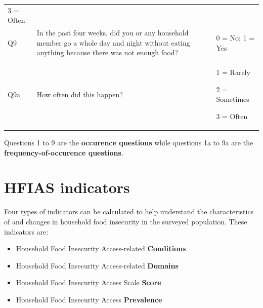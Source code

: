 \documentclass[12pt,]{book}
\theoremstyle{definition}
\theoremstyle{definition}
\theoremstyle{definition}
\theoremstyle{remark}
\begin{document}
\begin{longtable}[]{@{}lll@{}}
\begin{minipage}[t]{0.32\columnwidth}
3 = Often\strut
\end{minipage}\tabularnewline
\begin{minipage}[t]{0.07\columnwidth}\raggedright
Q9\strut
\end{minipage} & \begin{minipage}[t]{0.62\columnwidth}\raggedright
In the past four weeks, did you or any household member go a whole day
and night without eating anything because there was not enough
food?\strut
\end{minipage} & \begin{minipage}[t]{0.22\columnwidth}\raggedright
0 = No; 1 = Yes\strut
\end{minipage}\tabularnewline
\begin{minipage}[t]{0.32\columnwidth}\raggedright
Q9a\strut
\end{minipage} & \begin{minipage}[t]{0.32\columnwidth}\raggedright
How often did this happen?\strut
\end{minipage} & \begin{minipage}[t]{0.32\columnwidth}\raggedright
1 = Rarely

2 = Sometimes

3 = Often\strut
\end{minipage}\tabularnewline
\bottomrule
\end{longtable}

Questions 1 to 9 are the \textbf{occurence questions} while questions 1a
to 9a are the \textbf{frequency-of-occurence questions}.

\hypertarget{hfias-indicators}{%
\section{HFIAS indicators}\label{hfias-indicators}}

Four types of indicators can be calculated to help understand the
characteristics of and changes in household food insecurity in the
surveyed population. These indicators are:

\begin{itemize}
\item
  Household Food Insecurity Access-related \textbf{Conditions}
\item
  Household Food Insecurity Access-related \textbf{Domains}
\item
  Household Food Insecurity Access Scale \textbf{Score}
\item
  Household Food Insecurity Access \textbf{Prevalence}
\end{itemize}
\end{document}
